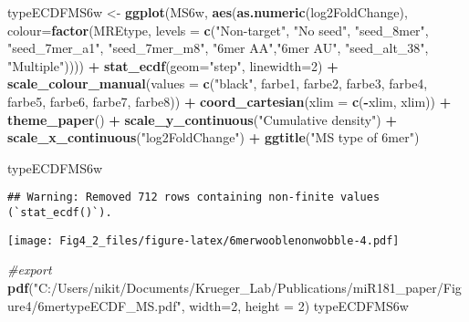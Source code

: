 \documentclass[
]{article}
\newenvironment{Shaded}{\begin{snugshade}}{\end{snugshade}}
\newcommand{\AttributeTok}[1]{\textcolor[rgb]{0.13,0.29,0.53}{#1}}
\newcommand{\CommentTok}[1]{\textcolor[rgb]{0.56,0.35,0.01}{\textit{#1}}}
\newcommand{\DecValTok}[1]{\textcolor[rgb]{0.00,0.00,0.81}{#1}}
\newcommand{\FunctionTok}[1]{\textcolor[rgb]{0.13,0.29,0.53}{\textbf{#1}}}
\newcommand{\NormalTok}[1]{#1}
\newcommand{\OtherTok}[1]{\textcolor[rgb]{0.56,0.35,0.01}{#1}}
\newcommand{\SpecialCharTok}[1]{\textcolor[rgb]{0.81,0.36,0.00}{\textbf{#1}}}
\newcommand{\StringTok}[1]{\textcolor[rgb]{0.31,0.60,0.02}{#1}}
\begin{document}
\begin{Shaded}
\begin{Highlighting}[]
\NormalTok{typeECDFMS6w }\OtherTok{\textless{}{-}} \FunctionTok{ggplot}\NormalTok{(MS6w, }\FunctionTok{aes}\NormalTok{(}\FunctionTok{as.numeric}\NormalTok{(log2FoldChange), }
                              \AttributeTok{colour=}\FunctionTok{factor}\NormalTok{(MREtype, }\AttributeTok{levels =} \FunctionTok{c}\NormalTok{(}\StringTok{"Non{-}target"}\NormalTok{, }\StringTok{"No seed"}\NormalTok{, }\StringTok{"seed\_8mer"}\NormalTok{, }\StringTok{"seed\_7mer\_a1"}\NormalTok{, }\StringTok{"seed\_7mer\_m8"}\NormalTok{, }\StringTok{"6mer AA"}\NormalTok{,}\StringTok{"6mer AU"}\NormalTok{, }\StringTok{"seed\_alt\_38"}\NormalTok{, }\StringTok{"Multiple"}\NormalTok{)))) }\SpecialCharTok{+} 
  \FunctionTok{stat\_ecdf}\NormalTok{(}\AttributeTok{geom=}\StringTok{"step"}\NormalTok{, }\AttributeTok{linewidth=}\DecValTok{2}\NormalTok{) }\SpecialCharTok{+}
  \FunctionTok{scale\_colour\_manual}\NormalTok{(}\AttributeTok{values =} \FunctionTok{c}\NormalTok{(}\StringTok{"black"}\NormalTok{, farbe1, farbe2, farbe3, farbe4, farbe5, farbe6, farbe7, farbe8)) }\SpecialCharTok{+}
  \FunctionTok{coord\_cartesian}\NormalTok{(}\AttributeTok{xlim =} \FunctionTok{c}\NormalTok{(}\SpecialCharTok{{-}}\NormalTok{xlim, xlim)) }\SpecialCharTok{+} 
  \FunctionTok{theme\_paper}\NormalTok{() }\SpecialCharTok{+}
  \FunctionTok{scale\_y\_continuous}\NormalTok{(}\StringTok{"Cumulative density"}\NormalTok{) }\SpecialCharTok{+} \FunctionTok{scale\_x\_continuous}\NormalTok{(}\StringTok{"log2FoldChange"}\NormalTok{) }\SpecialCharTok{+}
  \FunctionTok{ggtitle}\NormalTok{(}\StringTok{"MS type of 6mer"}\NormalTok{)}

\NormalTok{typeECDFMS6w}
\end{Highlighting}
\end{Shaded}

\begin{verbatim}
## Warning: Removed 712 rows containing non-finite values (`stat_ecdf()`).
\end{verbatim}

\texttt{[image: Fig4\_2\_files/figure-latex/6merwooblenonwobble-4.pdf]}

\begin{Shaded}
\begin{Highlighting}[]
\CommentTok{\#export}
\FunctionTok{pdf}\NormalTok{(}\StringTok{"C:/Users/nikit/Documents/Krueger\_Lab/Publications/miR181\_paper/Figure4/6mertypeECDF\_MS.pdf"}\NormalTok{, }\AttributeTok{width=}\DecValTok{2}\NormalTok{, }\AttributeTok{height =} \DecValTok{2}\NormalTok{)}
\NormalTok{typeECDFMS6w}
\end{Highlighting}
\end{Shaded}
\end{document}
